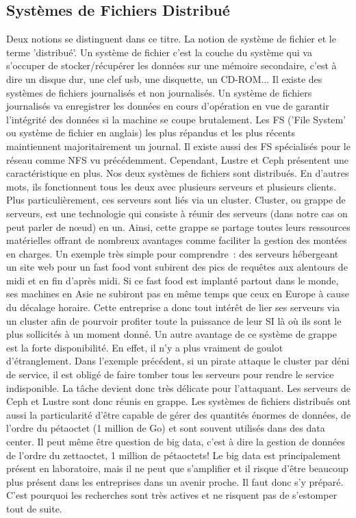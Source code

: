 \documentclass[12pt]{article}
\begin{document}
\subsection{Systèmes de Fichiers Distribué}
Deux notions se distinguent dans ce titre. La notion de système de fichier et le terme 'distribué'. 
	Un système de fichier c'est la couche du système qui va s'occuper de stocker/récupérer les données sur une mémoire secondaire, c'est à dire un disque dur, une clef usb, une disquette, un CD-ROM... Il existe des systèmes de fichiers journalisés et non journalisés. Un système de fichiers journalisés va enregistrer les données en cours d'opération en vue de garantir l'intégrité des données si la machine se coupe brutalement. Les FS ('File System' ou système de fichier en anglais) les plus répandus et les plus récents maintiennent majoritairement un journal. Il existe aussi des FS spécialisés pour le réseau comme NFS vu précédemment. Cependant, Lustre et Ceph présentent une caractéristique en plus.
	Nos deux systèmes de fichiers sont distribués. En d'autres mots, ils fonctionnent tous les deux avec plusieurs serveurs et plusieurs clients. Plus particulièrement, ces serveurs sont liés via un cluster. Cluster, ou grappe de serveurs, est une technologie qui consiste à réunir des serveurs (dans notre cas on peut parler de nœud) en un. Ainsi, cette grappe se partage toutes leurs ressources matérielles offrant de nombreux avantages comme faciliter la gestion des montées en charges. Un exemple très simple pour comprendre : des serveurs hébergeant un site web pour un fast food vont subirent des pics de requêtes aux alentours de midi et en fin d'après midi. Si ce fast food est implanté partout dans le monde, ses machines en Asie ne subiront pas en même temps que ceux en Europe à cause du décalage horaire. Cette entreprise a donc tout intérêt de lier ses serveurs via un cluster afin de pourvoir profiter toute la puissance de leur SI là où ils sont le plus sollicités à un moment donné. Un autre avantage de ce système de grappe est la forte disponibilité. En effet, il n'y a plus vraiment de goulot d'étranglement. Dans l'exemple précédent, si un pirate attaque le cluster par déni de service, il est obligé de faire tomber tous les serveurs pour rendre le service indisponible. La tâche devient donc très délicate pour l'attaquant. Les serveurs de Ceph et Lustre sont donc réunis en grappe. 
	Les systèmes de fichiers distribués ont aussi la particularité d'être capable de gérer des quantités énormes de données, de l'ordre du pétaoctet (1 million de Go) et sont souvent utilisés dans des data center. Il peut même être question de big data, c'est à dire la gestion de données de l'ordre du zettaoctet, 1 million de pétaoctets! Le big data est principalement présent en laboratoire, mais il ne peut que s'amplifier et il risque d'être beaucoup plus présent dans les entreprises dans un avenir proche. Il faut donc s'y préparé. C'est pourquoi les recherches sont très actives et ne risquent pas de s'estomper tout de suite.
\end{document}
